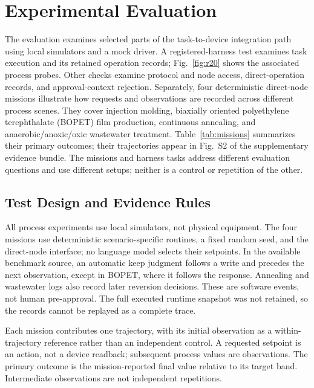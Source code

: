 \section{Experimental Evaluation}
\label{sec:eval}
The evaluation examines selected parts of the task-to-device integration path
using local simulators and a mock driver. A registered-harness test examines
task execution and its retained operation records; Fig.~\ref{fig:r20} shows
the associated process probes. Other checks examine protocol and node
access, direct-operation records, and approval-context rejection. Separately, four deterministic
direct-node missions illustrate how requests and observations are recorded
across different process scenes. They cover injection molding, biaxially
oriented polyethylene terephthalate (BOPET) film production, continuous annealing, and
anaerobic/anoxic/oxic wastewater treatment. Table~\ref{tab:missions} summarizes
their primary outcomes; their trajectories appear in Fig.~S2 of the
supplementary evidence bundle. The missions and harness tasks address different
evaluation questions and use different setups; neither is a control or
repetition of the other.

\subsection{Test Design and Evidence Rules}
\label{sec:eval-protocol}
All process experiments use local simulators, not physical equipment. The
four missions use deterministic scenario-specific routines, a fixed random
seed, and the direct-node interface; no language model selects their setpoints.
In the available benchmark source, an automatic keep judgment follows a write
and precedes the next observation, except in BOPET, where it follows the
response. Annealing and wastewater logs also record later reversion decisions.
These are software events, not human pre-approval. The full executed runtime
snapshot was not retained, so the records cannot be replayed as a complete
trace.

Each mission contributes one trajectory, with its initial observation as a
within-trajectory reference rather than an independent control. A requested
setpoint is an action, not a device readback; subsequent process values are
observations. The primary outcome is the mission-reported final value relative
to its target band. Intermediate observations are not independent repetitions.

